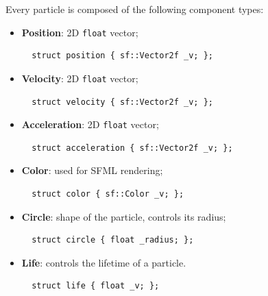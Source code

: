 \documentclass[twoside, 12pt, a4paper, openright]{book}
\begin{document}
Every particle is composed of the following component types:

\begin{itemize}
\item
  \textbf{Position}: 2D
  \texttt{float}
  vector;

  \begin{verbatim}
  struct position { sf::Vector2f _v; };
  \end{verbatim}
\item
  \textbf{Velocity}: 2D
  \texttt{float}
  vector;

  \begin{verbatim}
  struct velocity { sf::Vector2f _v; };
  \end{verbatim}
\item
  \textbf{Acceleration}: 2D
  \texttt{float}
  vector;

  \begin{verbatim}
  struct acceleration { sf::Vector2f _v; };
  \end{verbatim}
\item
  \textbf{Color}: used for SFML rendering;

  \begin{verbatim}
  struct color { sf::Color _v; };
  \end{verbatim}
\item
  \textbf{Circle}: shape of the particle, controls its radius;

  \begin{verbatim}
  struct circle { float _radius; };
  \end{verbatim}
\item
  \textbf{Life}: controls the lifetime of a particle.

  \begin{verbatim}
  struct life { float _v; };
  \end{verbatim}
\end{itemize}
\end{document}
